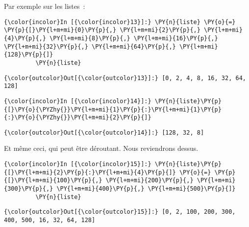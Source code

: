     Par exemple sur les listes~:

    \begin{Verbatim}[commandchars=\\\{\},frame=single,framerule=0.3mm,rulecolor=\color{cellframecolor}]
{\color{incolor}In [{\color{incolor}13}]:} \PY{n}{liste} \PY{o}{=} \PY{p}{[}\PY{l+m+mi}{0}\PY{p}{,} \PY{l+m+mi}{2}\PY{p}{,} \PY{l+m+mi}{4}\PY{p}{,} \PY{l+m+mi}{8}\PY{p}{,} \PY{l+m+mi}{16}\PY{p}{,} \PY{l+m+mi}{32}\PY{p}{,} \PY{l+m+mi}{64}\PY{p}{,} \PY{l+m+mi}{128}\PY{p}{]}
         \PY{n}{liste}
\end{Verbatim}


\begin{Verbatim}[commandchars=\\\{\},frame=single,framerule=0.3mm,rulecolor=\color{cellframecolor}]
{\color{outcolor}Out[{\color{outcolor}13}]:} [0, 2, 4, 8, 16, 32, 64, 128]
\end{Verbatim}
            
    \begin{Verbatim}[commandchars=\\\{\},frame=single,framerule=0.3mm,rulecolor=\color{cellframecolor}]
{\color{incolor}In [{\color{incolor}14}]:} \PY{n}{liste}\PY{p}{[}\PY{o}{\PYZhy{}}\PY{l+m+mi}{1}\PY{p}{:}\PY{l+m+mi}{1}\PY{p}{:}\PY{o}{\PYZhy{}}\PY{l+m+mi}{2}\PY{p}{]}
\end{Verbatim}


\begin{Verbatim}[commandchars=\\\{\},frame=single,framerule=0.3mm,rulecolor=\color{cellframecolor}]
{\color{outcolor}Out[{\color{outcolor}14}]:} [128, 32, 8]
\end{Verbatim}
            
    Et même ceci, qui peut être déroutant. Nous reviendrons dessus.

    \begin{Verbatim}[commandchars=\\\{\},frame=single,framerule=0.3mm,rulecolor=\color{cellframecolor}]
{\color{incolor}In [{\color{incolor}15}]:} \PY{n}{liste}\PY{p}{[}\PY{l+m+mi}{2}\PY{p}{:}\PY{l+m+mi}{4}\PY{p}{]} \PY{o}{=} \PY{p}{[}\PY{l+m+mi}{100}\PY{p}{,} \PY{l+m+mi}{200}\PY{p}{,} \PY{l+m+mi}{300}\PY{p}{,} \PY{l+m+mi}{400}\PY{p}{,} \PY{l+m+mi}{500}\PY{p}{]}
         \PY{n}{liste}
\end{Verbatim}


\begin{Verbatim}[commandchars=\\\{\},frame=single,framerule=0.3mm,rulecolor=\color{cellframecolor}]
{\color{outcolor}Out[{\color{outcolor}15}]:} [0, 2, 100, 200, 300, 400, 500, 16, 32, 64, 128]
\end{Verbatim}
            
